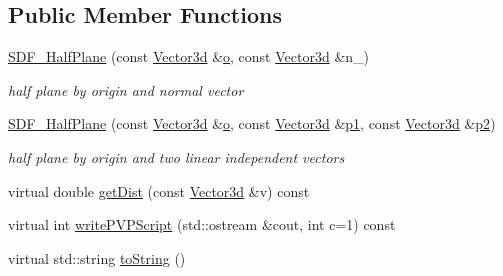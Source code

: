 \subsection*{Public Member Functions}
\begin{DoxyCompactItemize}
\item 
\hyperlink{classCPlantBox_1_1SDF__HalfPlane_a3389c75eeecdde472a740580b015f649}{S\+D\+F\+\_\+\+Half\+Plane} (const \hyperlink{classCPlantBox_1_1Vector3d}{Vector3d} \&\hyperlink{classCPlantBox_1_1SDF__HalfPlane_a9546987ce3f185224ca97c5b3aebe0d3}{o}, const \hyperlink{classCPlantBox_1_1Vector3d}{Vector3d} \&n\+\_\+)
\begin{DoxyCompactList}\small\item\em half plane by origin and normal vector \end{DoxyCompactList}\item 
\mbox{\label{classCPlantBox_1_1SDF__HalfPlane_abb755181a7348c8f3b780e28a0c46efd}} 
\hyperlink{classCPlantBox_1_1SDF__HalfPlane_abb755181a7348c8f3b780e28a0c46efd}{S\+D\+F\+\_\+\+Half\+Plane} (const \hyperlink{classCPlantBox_1_1Vector3d}{Vector3d} \&\hyperlink{classCPlantBox_1_1SDF__HalfPlane_a9546987ce3f185224ca97c5b3aebe0d3}{o}, const \hyperlink{classCPlantBox_1_1Vector3d}{Vector3d} \&\hyperlink{classCPlantBox_1_1SDF__HalfPlane_a60299a78ce8dad5494ef4a3a85997d04}{p1}, const \hyperlink{classCPlantBox_1_1Vector3d}{Vector3d} \&\hyperlink{classCPlantBox_1_1SDF__HalfPlane_a4022071d0f9f9531db0565ffb9a4f661}{p2})
\begin{DoxyCompactList}\small\item\em half plane by origin and two linear independent vectors \end{DoxyCompactList}\item 
virtual double \hyperlink{classCPlantBox_1_1SDF__HalfPlane_a2b3edca3db93d5a80e774baecd95d952}{get\+Dist} (const \hyperlink{classCPlantBox_1_1Vector3d}{Vector3d} \&v) const
\item 
virtual int \hyperlink{classCPlantBox_1_1SDF__HalfPlane_aa635bfdd7990a3369c7ef5c9c9e627a2}{write\+P\+V\+P\+Script} (std\+::ostream \&cout, int c=1) const
\item 
virtual std\+::string \hyperlink{classCPlantBox_1_1SDF__HalfPlane_afcf91da28b3743f4b701605181564aa6}{to\+String} ()
\end{DoxyCompactItemize}
